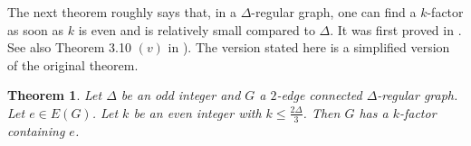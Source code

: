 \documentclass[11pt]{article}
\newtheorem{lemma}{Lemma}[section]
\newtheorem{theorem}[lemma]{Theorem}
\begin{document}



The next theorem roughly says that, in a $\Delta$-regular graph, one can find a $k$-factor  as soon as $k$ is even and is relatively small compared to $\Delta$. It was first proved in \cite{K84}. See also Theorem 3.10 $(v)$ in \cite{AK11}). The version stated here is a simplified version of the original theorem.    


\begin{theorem}\cite{K84}\label{lem:factor2/3}\label{lem:delta_odd_k_even_factor_including}
Let $\Delta$ be an odd integer and $G$ a $2$-edge connected $\Delta$-regular graph.  Let $e \in E(G)$. Let $k$ be an even integer with $k \leq \frac{2\Delta}{3}$. Then $G$ has a $k$-factor containing $e$. 
\end{theorem}


\end{document}
